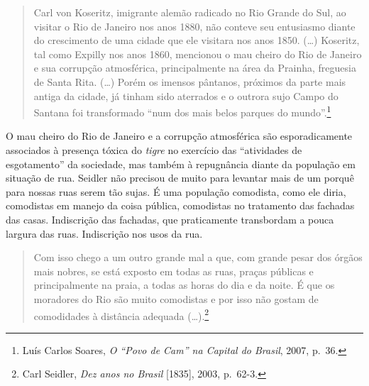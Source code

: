 \begin{quote}
Carl von Koseritz, imigrante alemão radicado no Rio Grande do Sul, ao
visitar o Rio de Janeiro nos anos 1880, não conteve seu entusiasmo
diante do crescimento de uma cidade que ele visitara nos anos 1850.
(\ldots{}) Koseritz, tal como Expilly nos anos 1860, mencionou o mau
cheiro do Rio de Janeiro e sua corrupção atmosférica, principalmente na
área da Prainha, freguesia de Santa Rita. (\ldots{}) Porém os imensos
pântanos, próximos da parte mais antiga da cidade, já tinham sido
aterrados e o outrora sujo Campo do Santana foi transformado ``num dos
mais belos parques do mundo''.\footnote{Luís Carlos Soares, \textit{O
  ``Povo de Cam'' na Capital do Brasil}, 2007, p.~36.}
\end{quote}

O mau cheiro do Rio de Janeiro e a corrupção atmosférica são
esporadicamente associados à presença tóxica do \textit{tigre} no
exercício das ``atividades de esgotamento'' da sociedade, mas também à
repugnância diante da população em situação de rua. Seidler não precisou
de muito para levantar mais de um porquê para nossas ruas serem tão
sujas. É uma população comodista, como ele diria, comodistas em manejo
da coisa pública, comodistas no tratamento das fachadas das casas.
Indiscrição das fachadas, que praticamente transbordam a pouca largura
das ruas. Indiscrição nos usos da rua.

\begin{quote}
Com isso chego a um outro grande mal a que, com grande pesar dos órgãos
mais nobres, se está exposto em todas as ruas, praças públicas e
principalmente na praia, a todas as horas do dia e da noite. É que os
moradores do Rio são muito comodistas e por isso não gostam de
comodidades à distância adequada (\dots{}).\footnote{Carl Seidler, \textit{Dez
  anos no Brasil} {[}1835{]}, 2003, p.~62-3.}
\end{quote}

